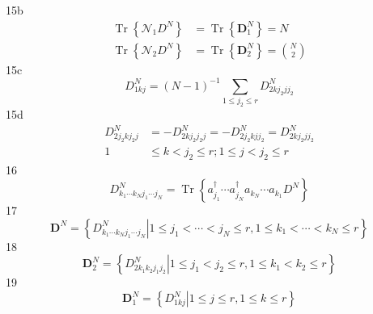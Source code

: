 \documentclass[aps,preprint]{revtex4}%
\begin{document}
15b%
\begin{align*}
\operatorname{Tr}\left\{  \mathcal{N}_{1}D^{N}\right\}   &  =\operatorname{Tr}%
\left\{  \mathbf{D}_{1}^{N}\right\}  =N\\
\operatorname{Tr}\left\{  \mathcal{N}_{2}D^{N}\right\}   &  =\operatorname{Tr}%
\left\{  \mathbf{D}_{2}^{N}\right\}  =\binom{N}{2}%
\end{align*}
15c%
\[
D_{1kj}^{N}=\left(  N-1\right)  ^{-1}\sum_{1\leq j_{2}\leq r}D_{2kj_{2}jj_{2}%
}^{N}%
\]
15d%
\begin{align*}
D_{2j_{2}kj_{2}j}^{N}  &  =-D_{2kj_{2}j_{2}j}^{N}=-D_{2j_{2}kjj_{2}}%
^{N}=D_{2kj_{2}jj_{2}}^{N}\\
1  &  \leq k<j_{2}\leq r;1\leq j<j_{2}\leq r
\end{align*}
16%
\[
D_{k_{1}\cdots k_{N}j_{1}\cdots j_{N}}^{N}=\operatorname{Tr}\left\{  a_{j_{1}%
}^{\dagger}\cdots a_{j_{N}}^{\dagger}a_{k_{N}}\cdots a_{k_{1}}D^{N}\right\}
\]
17%
\[
\mathbf{D}^{N}=\left\{  \left.  D_{k_{1}\cdots k_{N}j_{1}\cdots j_{N}}%
^{N}\right\vert 1\leq j_{1}<\cdots<j_{N}\leq r,1\leq k_{1}<\cdots<k_{N}\leq
r\right\}
\]
18%
\[
\mathbf{D}_{2}^{N}=\left\{  \left.  D_{2k_{1}k_{2}j_{1}j_{2}}^{N}\right\vert
1\leq j_{1}<j_{2}\leq r,1\leq k_{1}<k_{2}\leq r\right\}
\]
19%
\[
\mathbf{D}_{1}^{N}=\left\{  \left.  D_{1kj}^{N}\right\vert 1\leq j\leq r,1\leq
k\leq r\right\}
\]
\end{document}
